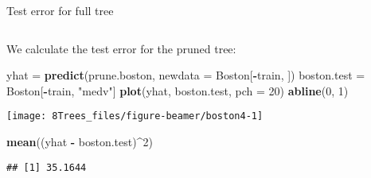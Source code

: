 \documentclass[10pt,ignorenonframetext,]{beamer}
\newenvironment{Shaded}{\begin{snugshade}}{\end{snugshade}}
\newcommand{\DataTypeTok}[1]{\textcolor[rgb]{0.13,0.29,0.53}{#1}}
\newcommand{\DecValTok}[1]{\textcolor[rgb]{0.00,0.00,0.81}{#1}}
\newcommand{\KeywordTok}[1]{\textcolor[rgb]{0.13,0.29,0.53}{\textbf{#1}}}
\newcommand{\NormalTok}[1]{#1}
\newcommand{\OperatorTok}[1]{\textcolor[rgb]{0.81,0.36,0.00}{\textbf{#1}}}
\newcommand{\StringTok}[1]{\textcolor[rgb]{0.31,0.60,0.02}{#1}}
\begin{document}
\begin{frame}[fragile]

\begin{block}{Test error for full tree}

\(~\)

We calculate the test error for the pruned tree:

\vspace{2mm}

\scriptsize

\begin{Shaded}
\begin{Highlighting}[]
\NormalTok{yhat =}\StringTok{ }\KeywordTok{predict}\NormalTok{(prune.boston, }\DataTypeTok{newdata =}\NormalTok{ Boston[}\OperatorTok{-}\NormalTok{train, ])}
\NormalTok{boston.test =}\StringTok{ }\NormalTok{Boston[}\OperatorTok{-}\NormalTok{train, }\StringTok{"medv"}\NormalTok{]}
\KeywordTok{plot}\NormalTok{(yhat, boston.test, }\DataTypeTok{pch =} \DecValTok{20}\NormalTok{)}
\KeywordTok{abline}\NormalTok{(}\DecValTok{0}\NormalTok{, }\DecValTok{1}\NormalTok{)}
\end{Highlighting}
\end{Shaded}

\begin{center}\texttt{[image: 8Trees\_files/figure-beamer/boston4-1]} \end{center}

\begin{Shaded}
\begin{Highlighting}[]
\KeywordTok{mean}\NormalTok{((yhat }\OperatorTok{-}\StringTok{ }\NormalTok{boston.test)}\OperatorTok{^}\DecValTok{2}\NormalTok{)}
\end{Highlighting}
\end{Shaded}

\begin{verbatim}
## [1] 35.1644
\end{verbatim}

\end{block}

\end{frame}
\end{document}
